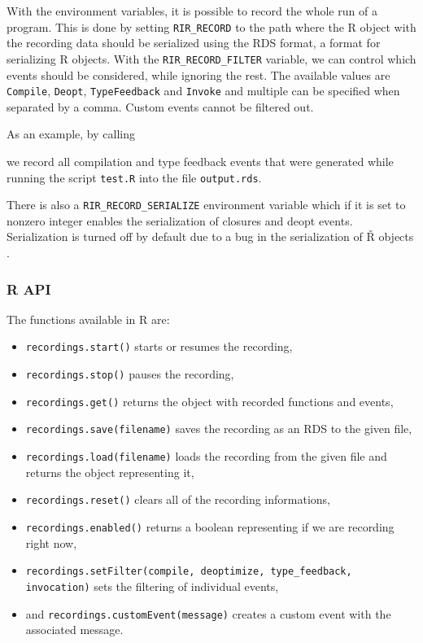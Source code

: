 With the environment variables, it is possible to record the whole run of a program. This is done by setting \texttt{RIR\_RECORD} to the path where the R object with the recording data should be serialized using the RDS format, a format for serializing R objects. With the \texttt{RIR\_RECORD\_FILTER} variable, we can control which events should be considered, while ignoring the rest. The available values are \texttt{Compile}, \texttt{Deopt}, \texttt{TypeFeedback} and \texttt{Invoke} and multiple can be specified when separated by a comma. Custom events cannot be filtered out.

As an example, by calling


\noindent we record all compilation and type feedback events that were generated while running the script \texttt{test.R} into the file \texttt{output.rds}.

There is also a \texttt{RIR\_RECORD\_SERIALIZE} environment variable which if it is set to nonzero integer enables the serialization of closures and deopt events. Serialization is turned off by default due to a bug in the serialization of Ř objects .

\subsubsection*{R API}

The functions available in R are\cite[documentation/recording.md]{rsh-github}:

\begin{itemize}
	\item \texttt{recordings.start()} starts or resumes the recording,
	\item \texttt{recordings.stop()} pauses the recording,
	\item \texttt{recordings.get()} returns the object with recorded functions and events,

	\item \texttt{recordings.save(filename)} saves the recording as an RDS to the given file,
	\item \texttt{recordings.load(filename)} loads the recording from the given file and returns the object representing it,

	\item \texttt{recordings.reset()} clears all of the recording informations,
	\item \texttt{recordings.enabled()} returns a boolean representing if we are recording right now,

	\item \texttt{recordings.setFilter(compile, deoptimize, type\_feedback, invocation)} sets the filtering of individual events,

	\item and \texttt{recordings.customEvent(message)} creates a custom event with the associated message.
\end{itemize}

